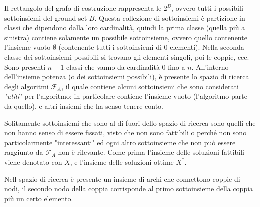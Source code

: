 \documentclass{article}
\begin{document}
    Il rettangolo del grafo di costruzione rappresenta le $2^B$, ovvero tutti i possibili
    sottoinsiemi del ground set $B$. Questa collezione di sottoinsiemi
    è partizione in classi che dipendono dalla loro cardinalità, quindi la prima classe (quella
    più a sinistra) contiene solamente un possibile sottoinsieme, ovvero quello contenente l'insieme
    vuoto $\emptyset$ (contenente tutti i sottoinsiemi di $0$ elementi). Nella seconda classe
    dei sottoinsiemi possibili si trovano gli elementi singoli, poi le coppie, ecc. Sono
    presenti $n+1$ classi che vanno da cardinalità $0$ fino a $n$. All'interno dell'insieme
    potenza (o dei sottoinsiemi possibili), è presente lo spazio di ricerca degli algoritmi $\mathcal{F}_A$,
    il quale contiene alcuni sottoinsiemi che sono considerati \textit{"utili"} per l'algoritmo: in
    particolare contiene l'insieme vuoto (l'algoritmo parte da quello), e altri insiemi che ha senso
    tenere conto.

    Solitamente sottoinsiemi che sono al di fuori dello spazio di ricerca sono quelli che non hanno senso di
    essere fissati, visto che non sono fattibili o perché non sono particolarmente "interessanti" ed
    ogni altro sottoinsieme che non può essere raggiunto da $\mathcal{F}_A$ non è rilevante. Come prima
    l'insieme delle soluzioni fattibili viene denotato con $X$, e l'insieme delle soluzioni ottime $X^*$.

    Nell spazio di ricerca è presente un insieme di archi che connettono coppie di nodi, il secondo nodo
    della coppia corrisponde al primo sottoinsieme della coppia più un certo elemento.
\end{document}
